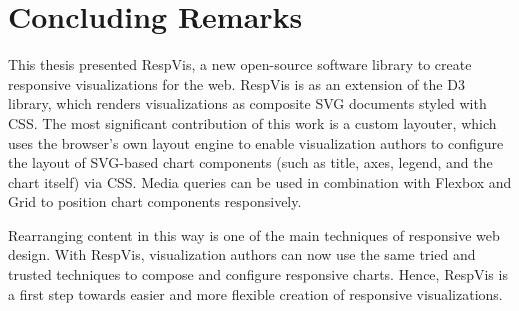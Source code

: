 \chapter{Concluding Remarks}
\label{chap:Concl}

This thesis presented RespVis, a new open-source software library to
create responsive visualizations for the web. RespVis is as an
extension of the D3 library, which renders visualizations as composite
SVG documents styled with CSS. The most significant contribution of
this work is a custom layouter, which uses the browser's own layout
engine to enable visualization authors to configure the layout of
SVG-based chart components (such as title, axes, legend, and the chart
itself) via CSS. Media queries can be used in combination with Flexbox
and Grid to position chart components responsively.

Rearranging content in this way is one of the main techniques of
responsive web design. With RespVis, visualization authors can now use
the same tried and trusted techniques to compose and configure
responsive charts. Hence, RespVis is a first step towards easier and
more flexible creation of responsive visualizations.

